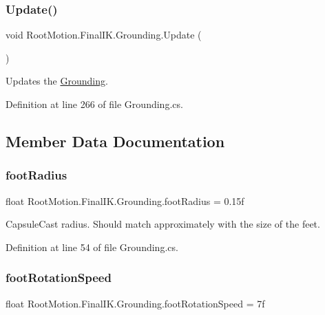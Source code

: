 \subsubsection{\texorpdfstring{Update()}{Update()}}
{\footnotesize\ttfamily void Root\+Motion.\+Final\+I\+K.\+Grounding.\+Update (\begin{DoxyParamCaption}{ }\end{DoxyParamCaption})}



Updates the \mbox{\hyperlink{class_root_motion_1_1_final_i_k_1_1_grounding}{Grounding}}. 



Definition at line 266 of file Grounding.\+cs.



\subsection{Member Data Documentation}
\mbox{\label{class_root_motion_1_1_final_i_k_1_1_grounding_a439605a5f72ba26878e5555ae166a955}} 
\subsubsection{\texorpdfstring{foot\+Radius}{footRadius}}
{\footnotesize\ttfamily float Root\+Motion.\+Final\+I\+K.\+Grounding.\+foot\+Radius = 0.\+15f}



Capsule\+Cast radius. Should match approximately with the size of the feet. 



Definition at line 54 of file Grounding.\+cs.

\mbox{\label{class_root_motion_1_1_final_i_k_1_1_grounding_ad587fd3c3eff6eba63705726acfd3ded}} 
\subsubsection{\texorpdfstring{foot\+Rotation\+Speed}{footRotationSpeed}}
{\footnotesize\ttfamily float Root\+Motion.\+Final\+I\+K.\+Grounding.\+foot\+Rotation\+Speed = 7f}



